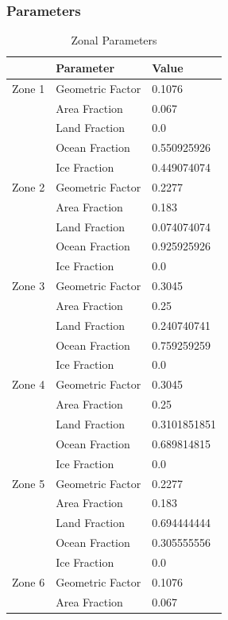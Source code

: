 \documentclass[12pt]{article}
\begin{document}
\subsubsection{Parameters} \label{sec:Parameters}
\begin{table}[H]
    \parbox{.45\linewidth}{
    \captionsetup{singlelinecheck = false, justification=justified}
    \caption{Zonal Parameters}
    \begin{tabular}{lll}
    \hline
     & Parameter & Value \\
    \hline
    Zone 1 & Geometric Factor & 0.1076 \\
     & Area Fraction & 0.067 \\
     & Land Fraction & 0.0 \\
     & Ocean Fraction & 0.550925926 \\ 
     & Ice Fraction & 0.449074074 \\
    \hline
    Zone 2 & Geometric Factor & 0.2277 \\
     & Area Fraction & 0.183 \\
     & Land Fraction & 0.074074074 \\
     & Ocean Fraction & 0.925925926 \\ 
     & Ice Fraction & 0.0\\
    \hline
    Zone 3 & Geometric Factor & 0.3045 \\
     & Area Fraction & 0.25 \\
     & Land Fraction & 0.240740741 \\
     & Ocean Fraction & 0.759259259 \\ 
     & Ice Fraction & 0.0\\
    \hline
    Zone 4 & Geometric Factor & 0.3045 \\
     & Area Fraction & 0.25 \\
     & Land Fraction & 0.3101851851 \\
     & Ocean Fraction & 0.689814815 \\ 
     & Ice Fraction & 0.0\\
    \hline
    Zone 5 & Geometric Factor & 0.2277 \\
     & Area Fraction & 0.183 \\
     & Land Fraction & 0.694444444 \\
     & Ocean Fraction & 0.305555556 \\ 
     & Ice Fraction & 0.0\\
    \hline
    Zone 6 & Geometric Factor & 0.1076 \\
     & Area Fraction & 0.067 \\

\end{tabular}}
\end{table}
\end{document}
